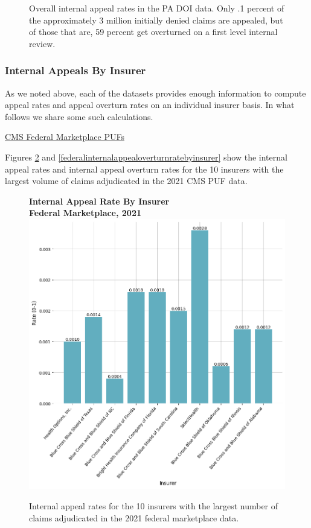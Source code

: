 \documentclass[12pt, a4paper,twoside,parskip=full]{report}
\theoremstyle{plain} %
\theoremstyle{definition} %
\theoremstyle{remark} %
\numberwithin{equation}{chapter}
\begin{document}
\begin{figure}[h!]
\begin{subfigure}[b]{0.49\textwidth}
			\end{subfigure}
			\caption{Overall internal appeal rates in the PA DOI data. Only .1 percent of the approximately 3 million initially denied claims are appealed, but of those that are, 59 percent get overturned on a first level internal review.}
			\label{painternalappealpie}
		\end{figure}
	
	\clearpage
		
				
		
		\subsubsection{Internal Appeals By Insurer}
		
		As we noted above, each of the datasets provides enough information to compute appeal rates and appeal overturn rates on an individual insurer basis. In what follows we share some such calculations.
		
		\underline{CMS Federal Marketplace PUFs}
		
		Figures \ref{federalinternalappealratebyinsurer} and \ref{federalinternalappealoverturnratebyinsurer} show the internal appeal rates and internal appeal overturn rates for the 10 insurers with the largest volume of claims adjudicated in the 2021 CMS PUF data.
		
		
		\begin{figure}[h!]
			\centering
			\textbf{Internal Appeal Rate By Insurer}\\
			\textbf{Federal Marketplace, 2021}\\
			\includegraphics[width=.8\columnwidth]{images/cms_puf/internal_appeal_rate_by_insurer.png}
			\caption{Internal appeal rates for the 10 insurers with the largest number of claims adjudicated in the 2021 federal marketplace data.}
			\label{federalinternalappealratebyinsurer}
		\end{figure}
	
\end{document}
